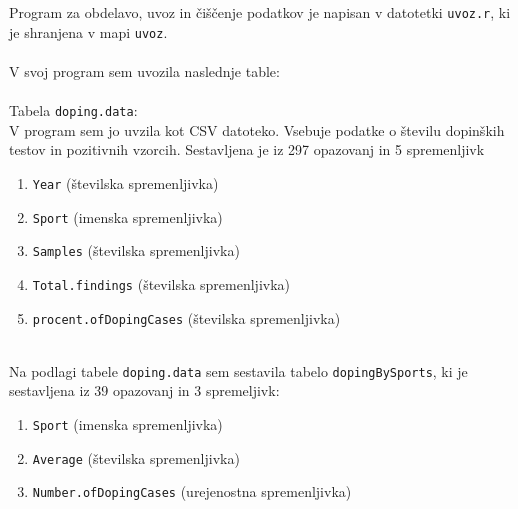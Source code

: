 \documentclass[11pt,a4paper]{article}
\begin{document}
Program za obdelavo, uvoz in čiščenje podatkov je napisan v datotetki \verb|uvoz.r|, ki je shranjena v mapi \verb|uvoz|.
\\
\\
V svoj program sem uvozila naslednje table:
\\
\\
Tabela \verb|doping.data|:
\\
V program sem jo uvzila kot CSV datoteko. Vsebuje podatke o številu dopinških testov in pozitivnih vzorcih.
Sestavljena je iz 297 opazovanj in 5 spremenljivk
\begin{enumerate}
\item{\verb|Year| (številska spremenljivka)}
\item{\verb|Sport| (imenska spremenljivka)}
\item{\verb|Samples| (številska spremenljivka)}
\item{\verb|Total.findings| (številska spremenljivka)}
\item{\verb|procent.ofDopingCases| (številska spremenljivka)}

\end{enumerate}

\
\\
Na podlagi tabele \verb|doping.data| sem sestavila tabelo \verb|dopingBySports|, ki je sestavljena iz 39 opazovanj in 3 spremeljivk:
\begin{enumerate}

\item{\verb|Sport| (imenska spremenljivka)}
\item{\verb|Average| (številska spremenljivka)}
\item{\verb|Number.ofDopingCases| (urejenostna spremenljivka)}


\end{enumerate}
\end{document}

